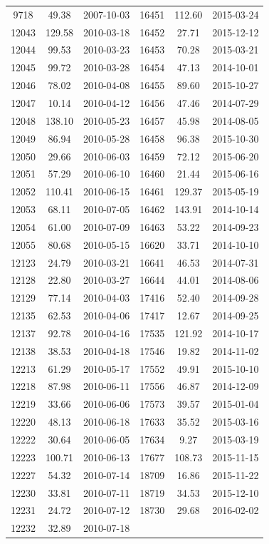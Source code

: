 \documentclass[pdflatex,sn-mathphys-num]{sn-jnl}
\theoremstyle{thmstyleone}
\theoremstyle{thmstyletwo}
\theoremstyle{thmstylethree}
\begin{document}
\begin{longtable}{ccc|ccc}
9718  & 49.38  & 2007-10-03 & 16451 & 112.60 & 2015-03-24  \\
12043 & 129.58 & 2010-03-18 & 16452 & 27.71  & 2015-12-12  \\
12044 & 99.53  & 2010-03-23 & 16453 & 70.28  & 2015-03-21  \\
12045 & 99.72  & 2010-03-28 & 16454 & 47.13  & 2014-10-01  \\
12046 & 78.02  & 2010-04-08 & 16455 & 89.60  & 2015-10-27  \\
12047 & 10.14  & 2010-04-12 & 16456 & 47.46  & 2014-07-29  \\
12048 & 138.10 & 2010-05-23 & 16457 & 45.98  & 2014-08-05  \\
12049 & 86.94  & 2010-05-28 & 16458 & 96.38  & 2015-10-30  \\
12050 & 29.66  & 2010-06-03 & 16459 & 72.12  & 2015-06-20  \\
12051 & 57.29  & 2010-06-10 & 16460 & 21.44  & 2015-06-16  \\
12052 & 110.41 & 2010-06-15 & 16461 & 129.37 & 2015-05-19  \\
12053 & 68.11  & 2010-07-05 & 16462 & 143.91 & 2014-10-14  \\
12054 & 61.00  & 2010-07-09 & 16463 & 53.22  & 2014-09-23  \\
12055 & 80.68  & 2010-05-15 & 16620 & 33.71  & 2014-10-10  \\
12123 & 24.79  & 2010-03-21 & 16641 & 46.53  & 2014-07-31  \\
12128 & 22.80  & 2010-03-27 & 16644 & 44.01  & 2014-08-06  \\
12129 & 77.14  & 2010-04-03 & 17416 & 52.40  & 2014-09-28  \\
12135 & 62.53  & 2010-04-06 & 17417 & 12.67  & 2014-09-25  \\
12137 & 92.78  & 2010-04-16 & 17535 & 121.92 & 2014-10-17  \\
12138 & 38.53  & 2010-04-18 & 17546 & 19.82  & 2014-11-02  \\
12213 & 61.29  & 2010-05-17 & 17552 & 49.91  & 2015-10-10  \\
12218 & 87.98  & 2010-06-11 & 17556 & 46.87  & 2014-12-09  \\
12219 & 33.66  & 2010-06-06 & 17573 & 39.57  & 2015-01-04  \\
12220 & 48.13  & 2010-06-18 & 17633 & 35.52  & 2015-03-16  \\
12222 & 30.64  & 2010-06-05 & 17634 & 9.27   & 2015-03-19  \\
12223 & 100.71 & 2010-06-13 & 17677 & 108.73 & 2015-11-15  \\
12227 & 54.32  & 2010-07-14 & 18709 & 16.86  & 2015-11-22  \\
12230 & 33.81  & 2010-07-11 & 18719 & 34.53  & 2015-12-10  \\
12231 & 24.72  & 2010-07-12 & 18730 & 29.68  & 2016-02-02  \\
12232 & 32.89  & 2010-07-18 &  &  &  \\ \hline
\end{longtable}
\end{document}
